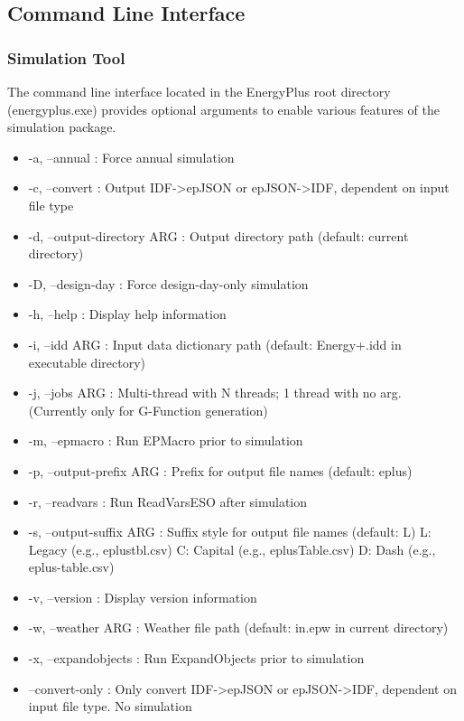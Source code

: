\subsection{Command Line Interface}

\subsubsection{Simulation Tool}

The command line interface located in the EnergyPlus root directory (energyplus.exe) provides optional arguments to enable various features of the simulation package.

\begin{itemize}

\item
  -a, --annual : Force annual simulation

\item
  -c, --convert : Output IDF->epJSON or epJSON->IDF, dependent on input file type

\item
  -d, --output-directory ARG : Output directory path (default: current directory)
  
\item
  -D, --design-day : Force design-day-only simulation

\item
  -h, --help : Display help information
  
\item
  -i, --idd ARG : Input data dictionary path (default: Energy+.idd in executable directory)

\item
  -j, --jobs ARG : Multi-thread with N threads; 1 thread with no arg. (Currently only for G-Function generation)
  
\item
  -m, --epmacro : Run EPMacro prior to simulation

\item
  -p, --output-prefix ARG : Prefix for output file names (default: eplus)

\item
  -r, --readvars : Run ReadVarsESO after simulation

\item
  -s, --output-suffix ARG : Suffix style for output file names (default: L)
  L: Legacy (e.g., eplustbl.csv)
  C: Capital (e.g., eplusTable.csv)
  D: Dash (e.g., eplus-table.csv)
  
\item
  -v, --version : Display version information
  
\item
  -w, --weather ARG : Weather file path (default: in.epw in current directory)

\item
  -x, --expandobjects : Run ExpandObjects prior to simulation
  
\item
  --convert-only : Only convert IDF->epJSON or epJSON->IDF, dependent on input file type. No simulation
  
\end{itemize}


